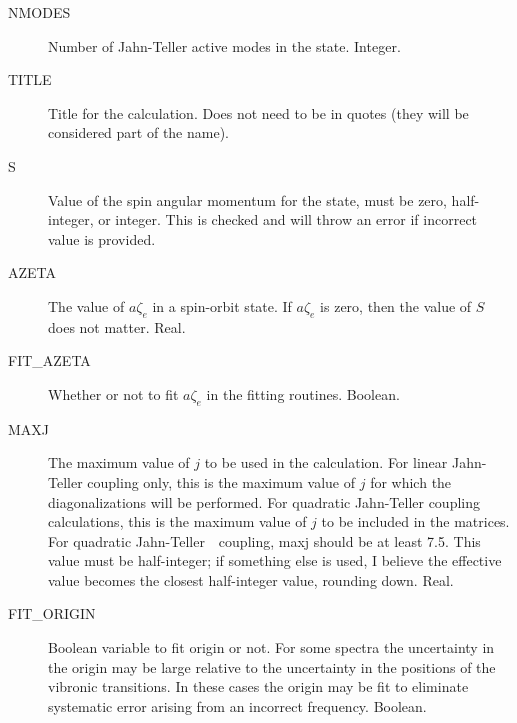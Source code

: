 \documentclass{article}
\newcommand{\JT}{Jahn-Teller\ }
\begin{document}
\begin{description}

\item[NMODES] Number of Jahn-Teller active modes in the state. Integer.

\item[TITLE] Title for the calculation. Does not need to be in quotes (they will be considered part of
  the name). 

\item[S] Value of the spin angular momentum for the state, must be
  zero, half-integer, or integer. This is checked and will throw an error if incorrect value is provided.

\item[AZETA] The value of $a\zeta _e$ in a spin-orbit state. If
  $a\zeta_e$ is zero, then the value of $S$ does not matter. Real.

\item[FIT\_AZETA] Whether or not to fit $a\zeta _e$ in the fitting
  routines. Boolean.


\item[MAXJ] The maximum value of $j$ to be used in the
  calculation. For linear Jahn-Teller coupling only, this is the
  maximum value of $j$ for which the diagonalizations will be
  performed. For quadratic Jahn-Teller coupling calculations, this is
  the maximum value of $j$ to be included in the matrices. For
  quadratic \JT\ coupling, maxj should be at least 7.5. This value
  must be half-integer; if something else is used, I believe the
  effective value becomes the closest half-integer value, rounding
  down. Real.

  \item[FIT\_ORIGIN] Boolean variable to fit origin or not. For some spectra the uncertainty in the origin may be large relative to the uncertainty in the positions of the vibronic transitions. In these cases the origin may be fit to eliminate systematic error arising from an incorrect frequency. Boolean.
  

\end{description}
\end{document}
